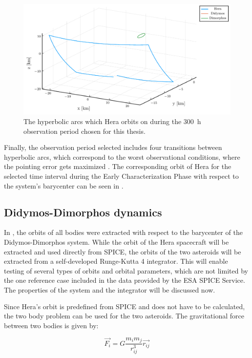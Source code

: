 \begin{figure}[h]
	\centering
	\includegraphics[width=\textwidth]{Figures/Chapter2/ECP_thesis_orbit_plot.pdf}
	\caption{The hyperbolic arcs which Hera orbits on during the \si{300\hour} observation period chosen for this thesis.}
	\label{fig:hera_thesis_orbit}
\end{figure}

Finally, the observation period selected includes four transitions between hyperbolic arcs, which correspond to the worst observational conditions, where the pointing error gets maximized \cite{hera-adcs}. The corresponding orbit of Hera for the selected time interval during the Early Characterization Phase with respect to the system's barycenter can be seen in . 

\subsection{Didymos-Dimorphos dynamics}

In , the orbits of all bodies were extracted with respect to the barycenter of the Didymos-Dimorphos system. While the orbit of the Hera spacecraft will be extracted and used directly from SPICE, the orbits of the two asteroids will be extracted from a self-developed Runge-Kutta 4 integrator. This will enable testing of several types of orbits and orbital parameters, which are not limited by the one reference case included in the data provided by the ESA SPICE Service. The properties of the system and the integrator will be discussed now. 

Since Hera's orbit is predefined from SPICE and does not have to be calculated, the two body problem can be used for the two asteroids. The gravitational force between two bodies is given by:

\begin{equation}
	\overrightarrow{F_{i}}=G \frac{m_{i} m_{j}}{r_{i j}^{3}} \overrightarrow{r_{i j}}
\end{equation}

